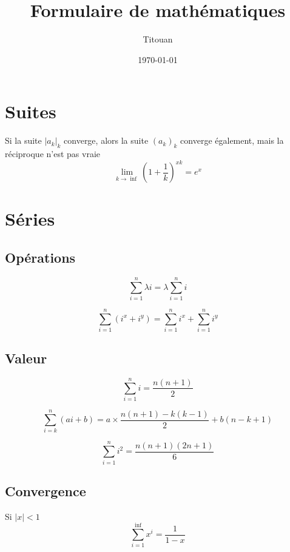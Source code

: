 \documentclass{article}
\title{Formulaire de mathématiques}
\author{Titouan \bsc{Christophe}}
\date{\today}
\begin{document}
\maketitle

\section{Suites}
Si la suite $|a_k|_k$ converge, alors la suite $(a_k)_k$ converge également, mais la réciproque n'est pas vraie
\begin{equation}
    \lim_{k\rightarrow\inf}(1+\frac{1}{k})^{xk} = e^x
\end{equation}


\section{Séries}
\subsection{Opérations}
\begin{equation}
    \sum_{i=1}^{n} \lambda i = \lambda\sum_{i=1}^{n} i
\end{equation}

\begin{equation}
    \sum_{i=1}^{n} (i^x + i^y) = \sum_{i=1}^{n} i^x + \sum_{i=1}^{n} i^y
\end{equation}

\subsection{Valeur}
\begin{equation}
    \sum_{i=1}^{n} i = \frac{n(n+1)}{2}
\end{equation}

\begin{equation}
    \sum_{i=k}^{n} (ai + b) = a\times\frac{n(n+1) - k(k-1)}{2} + b(n-k+1)
\end{equation}

\begin{equation}
    \sum_{i=1}^{n} i^2 = \frac{n(n+1)(2n+1)}{6}
\end{equation}

\subsection{Convergence}
Si $|x| < 1$ 
\begin{equation}
    \sum_{i=1}^{\inf} x^i = \frac{1}{1-x}
\end{equation}
\end{document}
